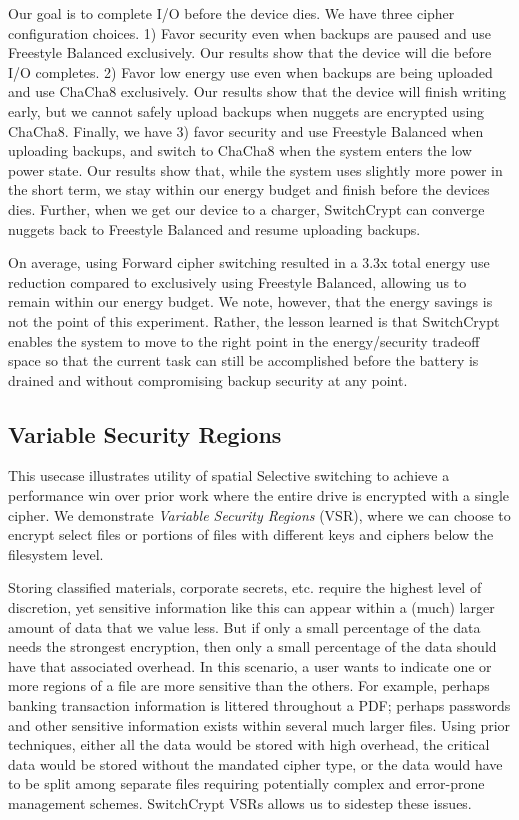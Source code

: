 Our goal is to complete I/O before the device dies. We have three cipher
configuration choices. 1) Favor security even when backups are paused and use
Freestyle Balanced exclusively. Our results show that the device will die before
I/O completes. 2) Favor low energy use even when backups are being uploaded and
use ChaCha8 exclusively. Our results show that the device will finish writing
early, but we cannot safely upload backups when nuggets are encrypted using
ChaCha8. Finally, we have 3) favor security and use Freestyle Balanced when
uploading backups, and switch to ChaCha8 when the system enters the low power
state. Our results show that, while the system uses slightly more power in the
short term, we stay within our energy budget and finish before the devices dies.
Further, when we get our device to a charger, SwitchCrypt can converge nuggets
back to Freestyle Balanced and resume uploading backups.

On average, using Forward cipher switching resulted in a 3.3x total energy use
reduction compared to exclusively using Freestyle Balanced, allowing us to
remain within our energy budget. We note, however, that the energy savings is
not the point of this experiment. Rather, the lesson learned is that SwitchCrypt
enables the system to move to the right point in the energy/security tradeoff
space so that the current task can still be accomplished before the battery is
drained and without compromising backup security at any point.

\subsection{Variable Security Regions} \label{subsec:uc2}

This usecase illustrates utility of spatial Selective switching to achieve a
performance win over prior work where the entire drive is encrypted with a
single cipher. We demonstrate \emph{Variable Security Regions} (VSR), where we
can choose to encrypt select files or portions of files with different keys and
ciphers below the filesystem level.

Storing classified materials, corporate secrets, etc. require the highest level
of discretion, yet sensitive information like this can appear within a (much)
larger amount of data that we value less. But if only a small percentage of the
data needs the strongest encryption, then only a small percentage of the data
should have that associated overhead. In this scenario, a user wants to indicate
one or more regions of a file are more sensitive than the others. For example,
perhaps banking transaction information is littered throughout a PDF; perhaps
passwords and other sensitive information exists within several much larger
files. Using prior techniques, either all the data would be stored with high
overhead, the critical data would be stored without the mandated cipher type, or
the data would have to be split among separate files requiring potentially
complex and error-prone management schemes. SwitchCrypt VSRs allows us to
sidestep these issues.

